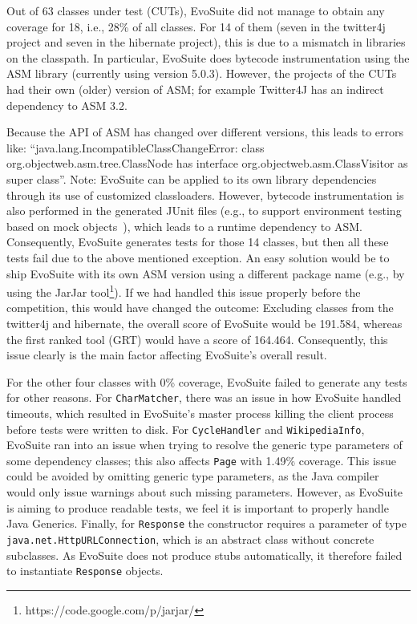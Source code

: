 \documentclass[10pt,conference,compsocconf]{IEEEtran}
\newcommand{\codeid}[1]{\texttt{#1}}
\def\<#1>{\codeid{#1}}
\newcommand{\EVOSUITE}{{\sc EvoSuite}\xspace}
\begin{document}
Out of 63 classes under test (CUTs), \EVOSUITE did not manage to
obtain any coverage for 18, i.e., 28\% of all classes.  For 14 of them
(seven in the twitter4j project and seven in the hibernate project),
this is due to a mismatch in libraries on the classpath.  In
particular, \EVOSUITE does bytecode instrumentation using the ASM
library (currently using version 5.0.3).  However, the projects of the
CUTs had their own (older) version of ASM; for example Twitter4J has
an indirect dependency to ASM 3.2. 

Because the API of ASM has changed over different versions, this leads
to errors like: ``java.lang.IncompatibleClassChangeError: class
org.objectweb.asm.tree.ClassNode has interface
org.objectweb.asm.ClassVisitor as super class''.  Note: \EVOSUITE can
be applied to its own library dependencies through its use of
customized classloaders. However, bytecode instrumentation is also
performed in the generated JUnit files (e.g., to support environment
testing based on mock objects~\cite{arcuri2014automated}), which leads
to a runtime dependency to ASM. Consequently, \EVOSUITE generates
tests for those 14 classes, but then all these tests fail due to the
above mentioned exception.  An easy solution would be to ship
\EVOSUITE with its own ASM version using a different package name
(e.g., by using the JarJar
tool\footnote{https://code.google.com/p/jarjar/}).
%
If we had handled this issue properly before the competition, this
would have changed the outcome: Excluding classes from the twitter4j
and hibernate, the overall score of \EVOSUITE would be 191.584,
whereas the first ranked tool (GRT) would have a score of
164.464. Consequently, this issue clearly is the main factor affecting
\EVOSUITE's overall result.

For the other four classes with 0\% coverage, \EVOSUITE failed to
generate any tests for other reasons. For \<CharMatcher>, there was 
an issue in how \EVOSUITE handled timeouts, which resulted in
\EVOSUITE's master process killing the client process before tests
were written to disk. For \<CycleHandler> and \<WikipediaInfo>,
\EVOSUITE ran into an issue when trying to resolve the generic type
parameters of some dependency classes; this also affects \<Page> with
1.49\% coverage. This issue could be avoided by omitting generic type
parameters, as the Java compiler would only issue warnings about such
missing parameters. However, as \EVOSUITE is aiming to produce
readable tests, we feel it is important to properly handle Java
Generics. Finally, for \<Response> the constructor requires a
parameter of type \<java.net.HttpURLConnection>, which is an abstract
class without concrete subclasses. As \EVOSUITE does not produce stubs
automatically, it therefore failed to instantiate \<Response> objects.
\end{document}
